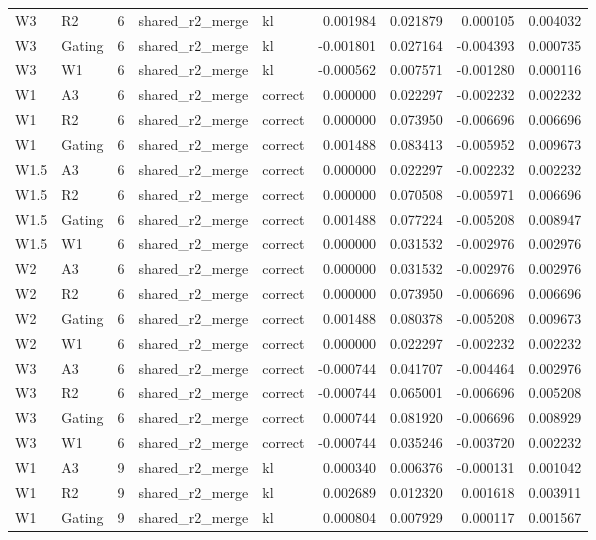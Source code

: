 \begin{tabular}{llrllrrrr}
W3 & R2 & 6 & shared_r2_merge & kl & 0.001984 & 0.021879 & 0.000105 & 0.004032 \\
W3 & Gating & 6 & shared_r2_merge & kl & -0.001801 & 0.027164 & -0.004393 & 0.000735 \\
W3 & W1 & 6 & shared_r2_merge & kl & -0.000562 & 0.007571 & -0.001280 & 0.000116 \\
W1 & A3 & 6 & shared_r2_merge & correct & 0.000000 & 0.022297 & -0.002232 & 0.002232 \\
W1 & R2 & 6 & shared_r2_merge & correct & 0.000000 & 0.073950 & -0.006696 & 0.006696 \\
W1 & Gating & 6 & shared_r2_merge & correct & 0.001488 & 0.083413 & -0.005952 & 0.009673 \\
W1.5 & A3 & 6 & shared_r2_merge & correct & 0.000000 & 0.022297 & -0.002232 & 0.002232 \\
W1.5 & R2 & 6 & shared_r2_merge & correct & 0.000000 & 0.070508 & -0.005971 & 0.006696 \\
W1.5 & Gating & 6 & shared_r2_merge & correct & 0.001488 & 0.077224 & -0.005208 & 0.008947 \\
W1.5 & W1 & 6 & shared_r2_merge & correct & 0.000000 & 0.031532 & -0.002976 & 0.002976 \\
W2 & A3 & 6 & shared_r2_merge & correct & 0.000000 & 0.031532 & -0.002976 & 0.002976 \\
W2 & R2 & 6 & shared_r2_merge & correct & 0.000000 & 0.073950 & -0.006696 & 0.006696 \\
W2 & Gating & 6 & shared_r2_merge & correct & 0.001488 & 0.080378 & -0.005208 & 0.009673 \\
W2 & W1 & 6 & shared_r2_merge & correct & 0.000000 & 0.022297 & -0.002232 & 0.002232 \\
W3 & A3 & 6 & shared_r2_merge & correct & -0.000744 & 0.041707 & -0.004464 & 0.002976 \\
W3 & R2 & 6 & shared_r2_merge & correct & -0.000744 & 0.065001 & -0.006696 & 0.005208 \\
W3 & Gating & 6 & shared_r2_merge & correct & 0.000744 & 0.081920 & -0.006696 & 0.008929 \\
W3 & W1 & 6 & shared_r2_merge & correct & -0.000744 & 0.035246 & -0.003720 & 0.002232 \\
W1 & A3 & 9 & shared_r2_merge & kl & 0.000340 & 0.006376 & -0.000131 & 0.001042 \\
W1 & R2 & 9 & shared_r2_merge & kl & 0.002689 & 0.012320 & 0.001618 & 0.003911 \\
W1 & Gating & 9 & shared_r2_merge & kl & 0.000804 & 0.007929 & 0.000117 & 0.001567 \\

\end{tabular}
